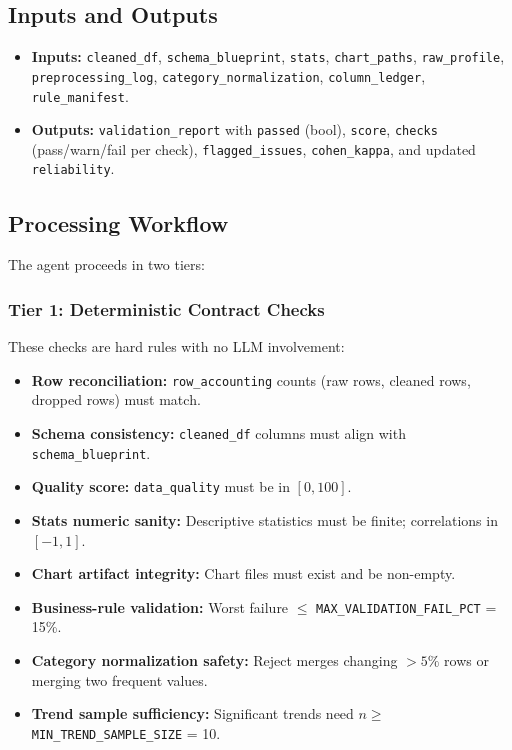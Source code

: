 \documentclass[12pt,a4paper,openany]{report}
\begin{document}
\subsection{Inputs and Outputs}
\begin{itemize}
	\item \textbf{Inputs:} \texttt{cleaned\_df}, \texttt{schema\_blueprint}, \texttt{stats}, \texttt{chart\_paths}, \texttt{raw\_profile}, \texttt{preprocessing\_log}, \texttt{category\_normalization}, \texttt{column\_ledger}, \texttt{rule\_manifest}.
	\item \textbf{Outputs:} \texttt{validation\_report} with \texttt{passed} (bool), \texttt{score}, \texttt{checks} (pass/warn/fail per check), \texttt{flagged\_issues}, \texttt{cohen\_kappa}, and updated \texttt{reliability}.
\end{itemize}

\subsection{Processing Workflow}
The agent proceeds in two tiers:

\subsubsection{Tier 1: Deterministic Contract Checks}
These checks are hard rules with no LLM involvement:
\begin{itemize}
	\item \textbf{Row reconciliation:} \texttt{row\_accounting} counts (raw rows, cleaned rows, dropped rows) must match.
	\item \textbf{Schema consistency:} \texttt{cleaned\_df} columns must align with \texttt{schema\_blueprint}.
	\item \textbf{Quality score:} \texttt{data\_quality} must be in $[0,100]$.
	\item \textbf{Stats numeric sanity:} Descriptive statistics must be finite; correlations in $[-1,1]$.
	\item \textbf{Chart artifact integrity:} Chart files must exist and be non-empty.
	\item \textbf{Business-rule validation:} Worst failure $\le$ \texttt{MAX\_VALIDATION\_FAIL\_PCT} = 15\%.
	\item \textbf{Category normalization safety:} Reject merges changing $>5\%$ rows or merging two frequent values.
	\item \textbf{Trend sample sufficiency:} Significant trends need $n \ge$ \texttt{MIN\_TREND\_SAMPLE\_SIZE} = 10.
\end{itemize}
\end{document}
